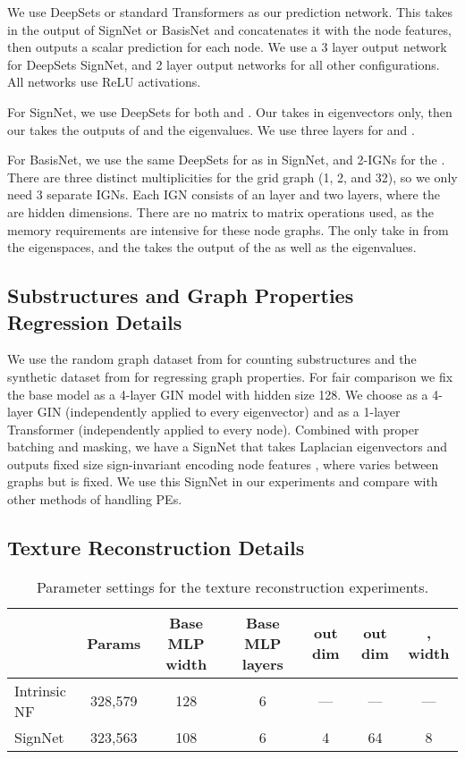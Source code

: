 \documentclass{article} \usepackage{iclr2023_conference,times}
\begin{document}
We use DeepSets or standard Transformers as our prediction network. This takes in the output of SignNet or BasisNet and concatenates it with the node features, then outputs a scalar prediction for each node. We use a 3 layer output network for DeepSets SignNet, and 2 layer output networks for all other configurations. All networks use ReLU activations.

For SignNet, we use DeepSets for both  and . Our  takes in eigenvectors only, then our  takes the outputs of  and the eigenvalues. We use three layers for  and .

For BasisNet, we use the same DeepSets for  as in SignNet, and 2-IGNs for the . There are three distinct multiplicities for the grid graph (1, 2, and 32), so we only need 3 separate IGNs. Each IGN consists of an  layer and two  layers, where the  are hidden dimensions. There are no matrix to matrix operations used, as the memory requirements are intensive for these  node graphs. The  only take in  from the eigenspaces, and the  takes the output of the  as well as the eigenvalues.



\subsection{Substructures and Graph Properties Regression Details}\label{sec:appdx count}
We use the random graph dataset from \cite{chen2020can} for counting substructures and the synthetic dataset from \cite{corso2020principal} for regressing graph properties. For fair comparison we fix the base model as a 4-layer GIN model with hidden size 128.
We choose  as a 4-layer GIN (independently applied to every eigenvector) and  as a 1-layer Transformer (independently applied to every node). Combined with proper batching and masking, we have a SignNet that takes Laplacian eigenvectors  and outputs fixed size sign-invariant encoding node features , where  varies between graphs but  is fixed. We use this SignNet in our experiments and compare with other methods of handling PEs.

\subsection{Texture Reconstruction Details}\label{appendix:texture}

\begin{table}[ht]
    \centering
    \caption{Parameter settings for the texture reconstruction experiments.}
    {\small
    \begin{tabular}{lcccccc}
    \toprule
         & Params & Base MLP width & Base MLP layers &  out dim &  out dim & ,  width \\
        \midrule
         Intrinsic NF & 328,579 & 128 & 6 &---&--- & ---\\
         SignNet & 323,563 & 108 & 6 & 4 & 64 & 8 \\
        \bottomrule
    \end{tabular}
    }
    \label{tab:texture_parameters}
\end{table}
\end{document}

